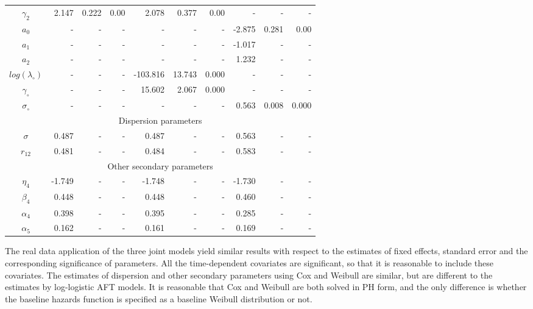 \begin{table}[ht]
\begin{tabular}{c|rrr|rrr|rrr}
  $\gamma_2$ & 2.147 & 0.222 & 0.00 & 2.078 & 0.377 & 0.00 & - & - & - \\
  $a_0$ & - & - & - & - & - & - & -2.875 & 0.281 & 0.00 \\ 
  $a_1$ & - & - & - & - & - & - & -1.017 & - & - \\ 
  $a_2$ & - & - & - & - & - & - & 1.232 & - & - \\ 
   \hline
   $log(\lambda_{\circ})$ & - & - & - & -103.816 & 13.743 & 0.000  & - & - & -\\
   $\gamma_{\circ}$ & - & - & - & 15.602& 2.067 & 0.000  & -  & - & - \\
   $\sigma_{\circ}$ &  - & - & -  & - & - & - & 0.563 & 0.008 & 0.000 \\
   \hline
   \multicolumn{10}{c}{Dispersion parameters} \\
   \hline
   $\sigma$ & 0.487 & - & - & 0.487 &- &-  & 0.563&- &-  \\
   $r_{12}$ & 0.481 & - & - & 0.484 &- &-  & 0.583 &- &-  \\
   \hline
   \multicolumn{10}{c}{Other secondary parameters} \\
   \hline
   $\eta_4$ & -1.749 & - & - & -1.748 &- &-  & -1.730 &- &-  \\
   $\beta_4$ & 0.448 & - & - & 0.448 &- &-  & 0.460 &- &-  \\
   $\alpha_4$ & 0.398 & - & - & 0.395  &- &-  & 0.285  &- &-  \\
   $\alpha_5$ & 0.162 & - & - & 0.161 &- &-  & 0.169 &- &-  \\
    \hline
\end{tabular}
\label{tbl:applc}
\end{table}



The real data application of the three joint models yield similar results with respect to the estimates of fixed effects, standard error and the corresponding significance of parameters. All the time-dependent covariates are significant, so that it is reasonable to include these covariates. The estimates of dispersion and other secondary parameters using Cox and Weibull are similar, but are different to the estimates by log-logistic AFT models. It is reasonable that Cox and Weibull are both solved in PH form, and the only difference is whether the baseline hazards function is specified as a baseline Weibull distribution or not.
